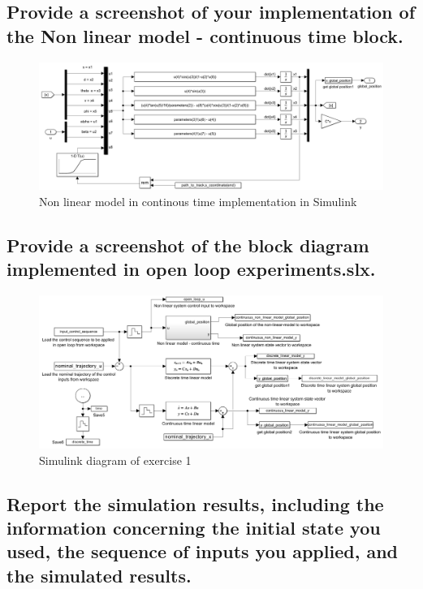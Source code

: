 \subsection{Provide a screenshot of your implementation of the Non linear model - continuous time block.}

\begin{figure}[H]
    \centering
    \includegraphics[width = 0.9\linewidth]{Latex report/image/nonLinModelContinousTime.png}
    \caption{Non linear model in continous time implementation in Simulink}
    \label{fig:continousTimeSimulink}
\end{figure}




\subsection{Provide a screenshot of the block diagram implemented in open loop experiments.slx.}
\begin{figure}[H]
    \centering
    \includegraphics[width = 0.9\linewidth]{Latex report/image/ex1Simulink.png}
    \caption{Simulink diagram of exercise 1}
    \label{fig:simulinkEx1}
\end{figure}





\subsection{Report the simulation results, including the information concerning the initial state you used, the sequence of inputs you applied, and the simulated results.}

